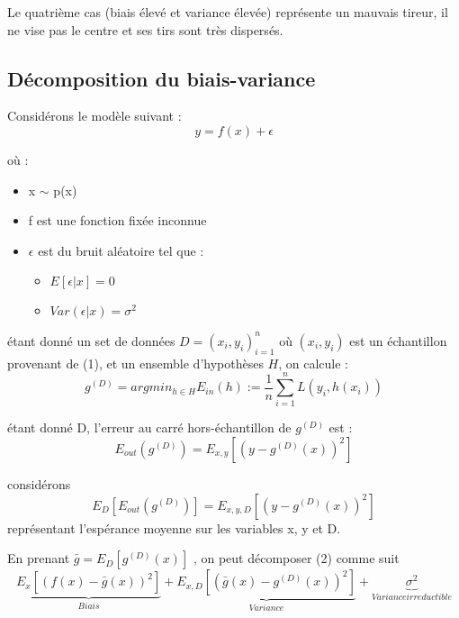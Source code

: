 \documentclass[a4paper]{article}
\begin{document}
Le quatrième cas (biais élevé et variance élevée) représente un mauvais tireur, il ne vise pas le centre et ses tirs sont très dispersés. \par

\newpage

\subsection{Décomposition du biais-variance}
\label{decomposition_Biais_Variance_section}

Considérons le modèle suivant : 
\begin{equation}
\label{decomposition_Biais_Variance}
y = f(x) + \epsilon
\end{equation}

où : 

\begin{itemize}
	\item x $\sim$ p(x)
	\item f est une fonction fixée inconnue
	\item $\epsilon$ est du bruit aléatoire tel que :
	\begin{itemize}
		\item $E[\epsilon|x] = 0$
		\item $Var(\epsilon|x) = \sigma^2$
	\end{itemize}
\end{itemize}


étant donné un set de données $D = {(x_i, y_i)}^n_{i=1}$ où $(x_i, y_i)$ est un échantillon provenant de (1), et un ensemble d'hypothèses $H$, on calcule : \newline
\[ g^{(D)} = argmin_{h\in H}  E_{in}(h) := \frac{1}{n} \sum_{i=1}^{n} L(y_i,h(x_i)) \]

étant donné D, l'erreur au carré hors-échantillon de $g^{(D)}$ est : \newline
\[ E_{out}(g^{(D)}) = E_{x,y}[(y - g^{(D)}(x))^2] \]

considérons 
\begin{equation}
E_D[E_{out}(g^{(D)})] = E_{x,y,D}[(y - g^{(D)}(x))^2]
\end{equation}
représentant l'espérance moyenne sur les variables x, y et D. \newline

En prenant $ \bar{g} = E_D[g^{(D)}(x)]$ , on peut décomposer (2) comme suit 
\[ \underbrace{E_x[(f(x) - \bar{g}(x))^2]}_{Biais} + \underbrace{E_{x,D}[(\bar{g}(x) - g^{(D)}(x))^2]}_{Variance} + \underbrace{\sigma^2}_{Variance irreductible} \]
\end{document}
